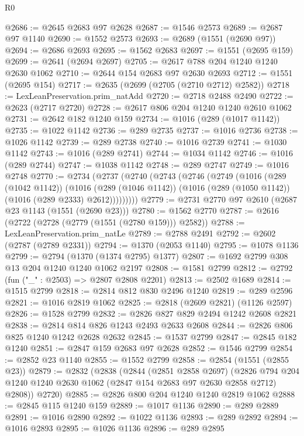 \begin{lexlean}{R0}
\begin{coremodule}
@2686 := @2645 @2683 @97 @2628
@2687 := @1546 @2573
@2689 := @2687 @97 @1140
@2690 := @1552 @2573
@2693 := @2689 (@1551 (@2690 @97))
@2694 := @2686 @2693
@2695 := @1562 @2683
@2697 := @1551 (@2695 @159)
@2699 := @2641 (@2694 @2697)
@2705 := @2617 @788 @204 @1240 @1240 @2630 @1062
@2710 := @2644 @154 @2683 @97 @2630 @2693
@2712 := @1551 (@2695 @154)
@2717 := @2635 (@2699 (@2705 (@2710 @2712) @2582))
@2718 := LexLeanPreservation.prim_natAdd
@2720 := @2718 @2488 @2490
@2722 := @2623 (@2717 @2720)
@2728 := @2617 @806 @204 @1240 @1240 @2610 @1062
@2731 := @2642 @182 @1240 @159
@2734 := @1016 (@289 (@1017 @1142))
@2735 := @1022 @1142
@2736 := @289 @2735
@2737 := @1016 @2736
@2738 := @1026 @1142
@2739 := @289 @2738
@2740 := @1016 @2739
@2741 := @1030 @1142
@2743 := @1016 (@289 @2741)
@2744 := @1034 @1142
@2746 := @1016 (@289 @2744)
@2747 := @1038 @1142
@2748 := @289 @2747
@2749 := @1016 @2748
@2770 := @2734
    (@2737
      (@2740
        (@2743
          (@2746
            (@2749
              (@1016
                (@289 (@1042 @1142))
                (@1016
                  (@289 (@1046 @1142))
                  (@1016 (@289 (@1050 @1142)) (@1016 (@289 @2333) @2612)))))))))
@2779 := @2731 @2770 @97 @2610 (@2687 @23 @1143 (@1551 (@2690 @23)))
@2780 := @1562 @2770
@2787 := @2616 (@2722 (@2728 (@2779 (@1551 (@2780 @159))) @2582))
@2788 := LexLeanPreservation.prim_natLe
@2789 := @2788 @2491
@2792 := @2602 (@2787 (@2789 @2331))
@2794 := @1370 (@2053 @1140)
@2795 := @1078 @1136
@2799 := @2794 (@1370 (@1374 @2795) @1377)
@2807 := @1692 @2799 @308 @13 @204 @1240 @1240 @1062 @2197
@2808 := @1581 @2799
@2812 := @2792 (fun ("_" : @2503) => @2807 @2808 @2201)
@2813 := @2502 @1689
@2814 := @1515 @2799
@2818 := @2814 @812 @830 @2496 @1240
@2819 := @289 @2596
@2821 := @1016 @2819 @1062
@2825 := @2818 (@2609 @2821) (@1126 @2597)
@2826 := @1528 @2799
@2832 := @2826 @827 @829 @2494 @1242 @2608 @2821
@2838 := @2814 @814 @826 @1243 @2493 @2633 @2608
@2844 := @2826 @806 @825 @1240 @1242 @2628 @2632
@2845 := @1537 @2799
@2847 := @2845 @182 @1240
@2851 := @2847 @159 @2683 @97 @2628
@2852 := @1546 @2799
@2854 := @2852 @23 @1140
@2855 := @1552 @2799
@2858 := @2854 (@1551 (@2855 @23))
@2879 := @2832
    (@2838
      (@2844
        (@2851 @2858 @2697)
        (@2826 @794 @204 @1240 @1240 @2630 @1062 (@2847 @154 @2683 @97 @2630 @2858 @2712) @2808))
      @2720)
@2885 := @2826 @800 @204 @1240 @1240 @2819 @1062
@2888 := @2845 @115 @1240 @159
@2889 := @1017 @1136
@2890 := @289 @2889
@2891 := @1016 @2890
@2892 := @1022 @1136
@2893 := @289 @2892
@2894 := @1016 @2893
@2895 := @1026 @1136
@2896 := @289 @2895

\end{coremodule}
\end{lexlean}
